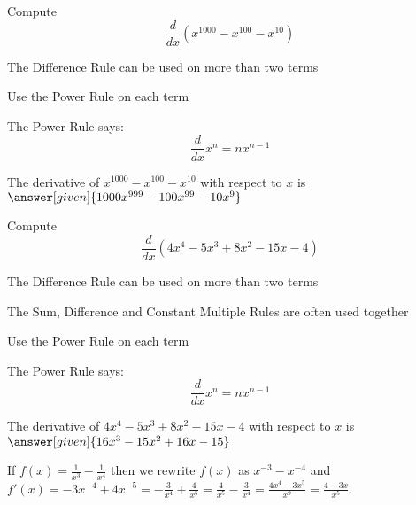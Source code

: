 \documentclass{ximera}
\begin{document}
\begin{problem} %
  Compute 
  \[
  \frac{d}{dx} \left(x^{1000} - x^{100} - x^{10}\right)
  \]
  
    \begin{hint}
		  The Difference Rule can be used on more than two terms
		\end{hint}
		\begin{hint}
      Use the Power Rule on each term
    \end{hint}
    \begin{hint}
      The Power Rule says:
      \[
      \frac{d}{dx} x^n = nx^{n-1}
      \]
    \end{hint}    
		The derivative of $x^{1000} - x^{100} - x^{10}$ with respect to $x$ is
		 $\answer[given]{1000x^{999} - 100x^{99} - 10x^9}$
	
\end{problem}


\begin{problem} %
  Compute 
  \[
  \frac{d}{dx} \left(4x^4 - 5x^3 + 8x^2 - 15x - 4\right)
  \]
  
    \begin{hint}
		  The Difference Rule can be used on more than two terms
		\end{hint}
		\begin{hint}
		  The Sum, Difference and Constant Multiple Rules are often used together 
		\end{hint}
		\begin{hint}
      Use the Power Rule on each term
    \end{hint}
    \begin{hint}
      The Power Rule says:
      \[
      \frac{d}{dx} x^n = nx^{n-1}
      \]
    \end{hint}    
		The derivative of $4x^4 - 5x^3 + 8x^2 - 15x - 4$ with respect to $x$ is
		 $\answer[given]{16x^3 - 15x^2 + 16x - 15}$
	
\end{problem}


\begin{example} %
 If $f(x) = \frac{1}{x^3} - \frac{1}{x^4}$ then we rewrite $f(x)$ as $x^{-3} - x^{-4}$ and 
$f'(x) = -3x^{-4} + 4x^{-5} = -\frac{3}{x^4} + \frac{4}{x^5} = \frac{4}{x^5}-\frac{3}{x^4} = 
\frac{4x^4 - 3x^5}{x^9} = \frac{4 - 3x}{x^5}$.
\end{example}
\end{document}
